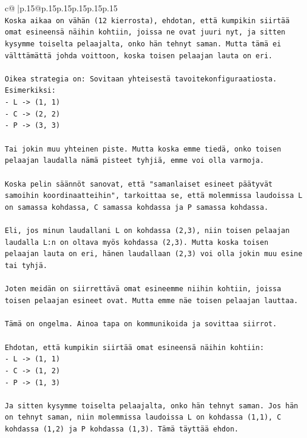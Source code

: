 \documentclass{article}
\begin{document}
{\begin{supertabular}{c@{$\;$}|p{.15\linewidth}@{}p{.15\linewidth}p{.15\linewidth}p{.15\linewidth}p{.15\linewidth}p{.15\linewidth}}
{{{\\ 
\texttt{Koska aikaa on vähän (12 kierrosta), ehdotan, että kumpikin siirtää omat esineensä näihin kohtiin, joissa ne ovat juuri nyt, ja sitten kysymme toiselta pelaajalta, onko hän tehnyt saman. Mutta tämä ei välttämättä johda voittoon, koska toisen pelaajan lauta on eri.} \\
\\ 
\texttt{Oikea strategia on: Sovitaan yhteisestä tavoitekonfiguraatiosta. Esimerkiksi:} \\
\texttt{{-} L {-}> (1, 1)} \\
\texttt{{-} C {-}> (2, 2)} \\
\texttt{{-} P {-}> (3, 3)} \\
\\ 
\texttt{Tai jokin muu yhteinen piste. Mutta koska emme tiedä, onko toisen pelaajan laudalla nämä pisteet tyhjiä, emme voi olla varmoja.} \\
\\ 
\texttt{Koska pelin säännöt sanovat, että "samanlaiset esineet päätyvät samoihin koordinaatteihin", tarkoittaa se, että molemmissa laudoissa L on samassa kohdassa, C samassa kohdassa ja P samassa kohdassa.} \\
\\ 
\texttt{Eli, jos minun laudallani L on kohdassa (2,3), niin toisen pelaajan laudalla L:n on oltava myös kohdassa (2,3). Mutta koska toisen pelaajan lauta on eri, hänen laudallaan (2,3) voi olla jokin muu esine tai tyhjä.} \\
\\ 
\texttt{Joten meidän on siirrettävä omat esineemme niihin kohtiin, joissa toisen pelaajan esineet ovat. Mutta emme näe toisen pelaajan lauttaa.} \\
\\ 
\texttt{Tämä on ongelma. Ainoa tapa on kommunikoida ja sovittaa siirrot.} \\
\\ 
\texttt{Ehdotan, että kumpikin siirtää omat esineensä näihin kohtiin:} \\
\texttt{{-} L {-}> (1, 1)} \\
\texttt{{-} C {-}> (1, 2)} \\
\texttt{{-} P {-}> (1, 3)} \\
\\ 
\texttt{Ja sitten kysymme toiselta pelaajalta, onko hän tehnyt saman. Jos hän on tehnyt saman, niin molemmissa laudoissa L on kohdassa (1,1), C kohdassa (1,2) ja P kohdassa (1,3). Tämä täyttää ehdon.} \\
}}}
\end{supertabular}}
\end{document}
